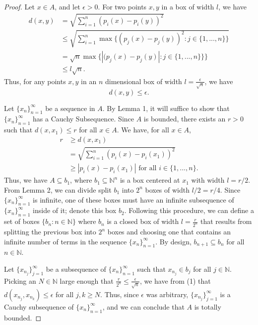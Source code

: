 \documentclass[10pt,a4paper]{article}
\theoremstyle{theorem}
\theoremstyle{definition}
\begin{document}
\begin{proof}
Let $x \in A$, and let $\epsilon > 0$.  For two points $x, y$ in a box of width $l$, we have 
\begin{align*}
d(x, y) &= \sqrt{\sum_{i = 1}^n (p_i(x) - p_i(y))^2}\\
&\leq \sqrt{\sum_{i = 1}^n \max\{(p_j(x) - p_j(y))^2 :j \in \{1,...,n\} \}} \\
&= \sqrt{n} \max\{|(p_j(x) - p_j(y)| :j \in \{1,...,n\} \} \}\\
&\leq l \sqrt{n}.
\end{align*}
Thus, for any points $x, y$ in an $n$ dimensional box of width $l = \frac{\epsilon}{\sqrt{n}}$, we have 
\begin{equation}
d(x, y) \leq \epsilon.
\end{equation}

Let $\{x_n \}_{n=1}^\infty$ be a sequence in $A$.  By Lemma 1, it will suffice to show that $\{x_n \}_{n=1}^\infty$ has a Cauchy Subsequence.  Since $A$ is bounded, there exists an $r > 0$ such that $d(x, x_1) \leq r$ for all $x \in A$.  We have, for all $x \in A$, 
\begin{align*}
r &\geq d(x, x_1)\\
&= \sqrt{\sum_{i = 1}^n (p_i(x) - p_i(x_1))^2}\\
&\geq  |p_i(x) - p_i(x_1)| \text{ for all } i \in \{1,...,n\}.
\end{align*}
Thus, we have $A \subseteq b_1$, where $b_1 \subseteq \mathbb{N}^n$ is a box centered at $x_1$ with width $l = r/2$. From Lemma 2, we can divide split $b_1$ into $2^n$ boxes of width $l/2 = r/4$. Since $\{x_n \}_{n=1}^\infty$ is infinite, one of these boxes must have an infinite subsequence of $\{x_n \}_{n=1}^\infty$ inside of it; denote this box $b_2$. Following this procedure, we can define a set of boxes $\{b_n: n \in \mathbb{N} \}$ where $b_n$ is a closed box of width $l = \frac{r}{2^n}$ that results from splitting the previous box into $2^n$ boxes and choosing one that contains an infinite number of terms in the sequence $\{x_n \}_{n=1}^\infty$. By design, $b_{n+1} \subseteq b_{n}$ for all $n \in \mathbb{N}$. 

Let $\{x_{n_j}\}_{j=1}^\infty$ be a subsequence of $\{x_n \}_{n=1}^\infty$ such that $x_{n_j} \in b_j$ for all $j \in \mathbb{N}$. Picking  an $N \in \mathbb{N}$ large enough that $\frac{r}{2^n} \leq \frac{\epsilon}{\sqrt{n}}$, we have from (1) that $d(x_{n_j},  x_{n_k}) \leq \epsilon$ for all $j, k \geq N$. Thus, since $\epsilon$ was arbitrary,  $\{x_{n_j}\}_{j=1}^\infty$ is a Cauchy subsequence of $\{x_n \}_{n=1}^\infty$, and we can conclude that $A$ is totally bounded.
\end{proof}
\end{document}
